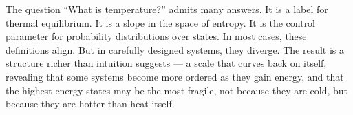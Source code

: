 The question “What is temperature?” admits many answers. It is a label for thermal equilibrium. It is a slope in the space of entropy. It is the control parameter for probability distributions over states. In most cases, these definitions align. But in carefully designed systems, they diverge. The result is a structure richer than intuition suggests — a scale that curves back on itself, revealing that some systems become more ordered as they gain energy, and that the highest-energy states may be the most fragile, not because they are cold, but because they are hotter than heat itself.
